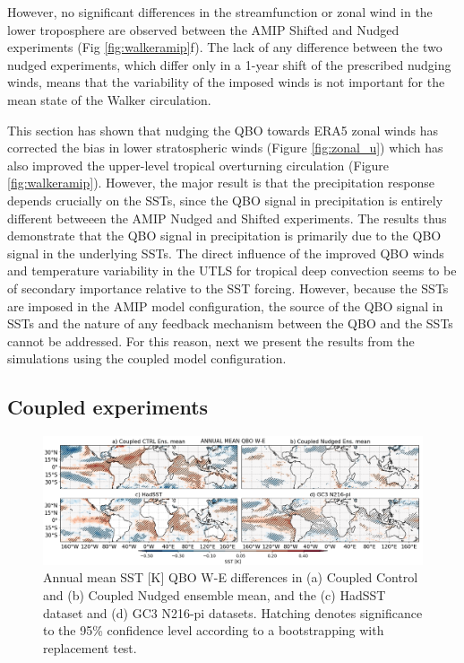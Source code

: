 However, no significant differences in the streamfunction or zonal wind in the lower troposphere are observed between the AMIP Shifted and Nudged experiments (Fig \ref{fig:walkeramip}f). The lack of any difference between the two nudged experiments, which differ only in a 1-year shift of the prescribed nudging winds, means that the variability of the imposed winds is not important for the mean state of the Walker circulation. %

This section has shown that nudging the QBO towards ERA5 zonal winds has corrected the bias in lower stratospheric winds (Figure \ref{fig:zonal_u}) which has also improved the upper-level tropical overturning circulation (Figure \ref{fig:walkeramip}). However, the major result is that the precipitation response depends crucially on the SSTs, since the QBO signal in precipitation is entirely different betweeen the AMIP Nudged and Shifted experiments. The results thus demonstrate that the QBO signal in precipitation is primarily due to the QBO signal in the underlying SSTs.
 The direct influence of the improved QBO winds and temperature variability in the UTLS for tropical deep convection seems to be of secondary importance relative to the SST forcing. However, because the SSTs are imposed in the AMIP model configuration, the source of the QBO signal in SSTs and the nature of any feedback mechanism between the QBO and the SSTs cannot be addressed. For this reason, next we present the results from the simulations using the coupled model configuration.  


\subsection{Coupled experiments}

\begin{figure}[t!]
\centering
 \includegraphics[width=\linewidth]{figures/sstseasonal_climqbowqboe.png}
\caption[Annual mean SST response to the QBO in coupled nudged experiments]{ Annual mean SST [K] QBO W-E differences in (a) Coupled Control and (b) Coupled Nudged ensemble mean, and the (c) HadSST dataset and (d) GC3 N216-pi datasets. Hatching denotes significance to the 95\% confidence level according to a bootstrapping with replacement test.}
\label{fig:sst_clim_coupled}
\end{figure}

